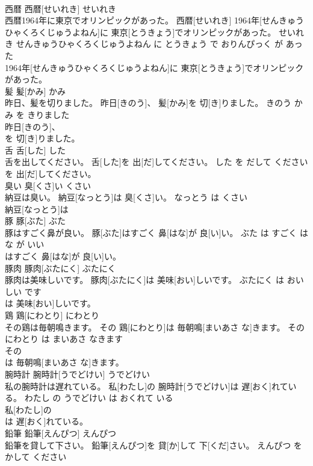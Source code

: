 \documentclass[8pt]{extreport}
\begin{document}
\begin{CJK}{UTF8}{min}
\\	西暦	西暦[せいれき]	せいれき	
\\	西暦1964年に東京でオリンピックがあった。	西暦[せいれき] 1964年[せんきゅうひゃくろくじゅうよねん]に 東京[とうきょう]でオリンピックがあった。	せいれき せんきゅうひゃくろくじゅうよねん に とうきょう で おりんぴっく が あった	
\\	1964年[せんきゅうひゃくろくじゅうよねん]に 東京[とうきょう]でオリンピックがあった。			
\\	髪	髪[かみ]	かみ	
\\	昨日、髪を切りました。	昨日[きのう]、 髪[かみ]を 切[き]りました。	きのう かみ を きりました	
\\	昨日[きのう]、
\\	を 切[き]りました。			
\\	舌	舌[した]	した	
\\	舌を出してください。	舌[した]を 出[だ]してください。	した を だして ください	
\\	を 出[だ]してください。			
\\	臭い	臭[くさ]い	くさい	
\\	納豆は臭い。	納豆[なっとう]は 臭[くさ]い。	なっとう は くさい	
\\	納豆[なっとう]は
\\	豚	豚[ぶた]	ぶた	
\\	豚はすごく鼻が良い。	豚[ぶた]はすごく 鼻[はな]が 良[い]い。	ぶた は すごく はな が いい	
\\	はすごく 鼻[はな]が 良[い]い。			
\\	豚肉	豚肉[ぶたにく]	ぶたにく	
\\	豚肉は美味しいです。	豚肉[ぶたにく]は 美味[おい]しいです。	ぶたにく は おいしい です	
\\	は 美味[おい]しいです。			
\\	鶏	鶏[にわとり]	にわとり	
\\	その鶏は毎朝鳴きます。	その 鶏[にわとり]は 毎朝鳴[まいあさ な]きます。	その にわとり は まいあさ なきます	
\\	その
\\	は 毎朝鳴[まいあさ な]きます。			
\\	腕時計	腕時計[うでどけい]	うでどけい	
\\	私の腕時計は遅れている。	私[わたし]の 腕時計[うでどけい]は 遅[おく]れている。	わたし の うでどけい は おくれて いる	
\\	私[わたし]の
\\	は 遅[おく]れている。			
\\	鉛筆	鉛筆[えんぴつ]	えんぴつ	
\\	鉛筆を貸して下さい。	鉛筆[えんぴつ]を 貸[か]して 下[くだ]さい。	えんぴつ を かして ください	

\end{CJK}
\end{document}
